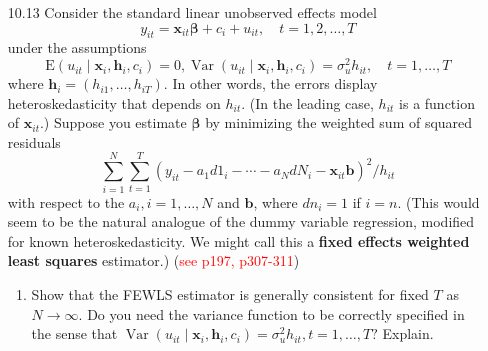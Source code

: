 \begin{enumerate}
    
    \item[10.13] Consider the standard linear unobserved effects model 
    \[ y_{i t}=\mathbf{x}_{i t} \boldsymbol{\beta}+c_{i}+u_{i t}, \quad t=1,2, \ldots, T \]
    under the assumptions
    \[ \mathrm{E}\left(u_{i t} \mid \mathbf{x}_{i}, \mathbf{h}_{i}, c_{i}\right)=0, \operatorname{Var}\left(u_{i t} \mid \mathbf{x}_{i}, \mathbf{h}_{i}, c_{i}\right)=\sigma_{u}^{2} h_{i t}, \quad t=1, \ldots, T \]
    where $\mathbf{h}_{i}=\left(h_{i 1}, \ldots, h_{i T}\right) .$ In other words, the errors display heteroskedasticity that depends on $h_{i t}$. (In the leading case, $h_{i t}$ is a function of $\mathbf{x}_{i t}$.) Suppose you estimate $\boldsymbol{\beta}$ by minimizing the weighted sum of squared residuals
    \[ \sum_{i=1}^{N} \sum_{t=1}^{T}\left(y_{i t}-a_{1} d 1_{i}-\cdots-a_{N} d N_{i}-\mathbf{x}_{i t} \mathbf{b}\right)^{2} / h_{i t} \]
    with respect to the $a_{i}, i=1, \ldots, N$ and $\mathbf{b}$, where $d n_{i}=1$ if $i=n .$ (This would seem to be the natural analogue of the dummy variable regression, modified for known heteroskedasticity. We might call this a \textbf{fixed effects weighted least squares} estimator.) (\textcolor{red}{see p197, p307-311})
    \begin{enumerate}
        \item Show that the FEWLS estimator is generally consistent for fixed $T$ as $N \rightarrow \infty$. Do you need the variance function to be correctly specified in the sense that $\operatorname{Var}\left(u_{i t} \mid \mathbf{x}_{i}, \mathbf{h}_{i}, c_{i}\right)=\sigma_{u}^{2} h_{i t}, t=1, \ldots, T ?$ Explain.
        

\end{enumerate}
\end{enumerate}
